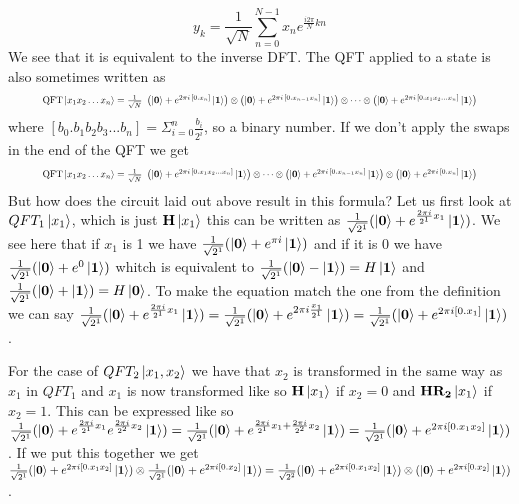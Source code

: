 $$y_{k}={\frac {1}{\sqrt {N}}}\sum _{n=0}^{N-1}x_{n}e^{{\frac {i2\pi }{N}}kn}$$
We see that it is equivalent to the inverse DFT.
The QFT applied to a state is also sometimes written as 
\begin{equation*}
\resizebox{.9\hsize}{!}{${\text{QFT}}\ket{x_{1}x_{2}\ldots x_{n}} ={\frac {1}{\sqrt {N}}}\ \left(\ket{\qtz} +e^{2\pi i\,[0.x_{n}]}\ket{\qto} \right)\otimes \left(\ket{\qtz} +e^{2\pi i\,[0.x_{n-1}x_{n}]}\ket{\qto} \right)\otimes \cdots \otimes \left(\ket{\qtz} +e^{2\pi i\,[0.x_{1}x_{2}\ldots x_{n}]}\ket{\qto} \right)$}
\end{equation*}
where $[b_0.b_1b_2b_3...b_n]=\Sigma^{n}_{i=0}\frac{b_i}{2^i}$, so a binary number\cite{osd}. If we don't apply the swaps in the end of the QFT we get 
\begin{equation*}
    \resizebox{.9\hsize}{!}{${\text{QFT}}\ket{x_{1}x_{2}\ldots x_{n}}={\frac {1}{\sqrt {N}}}\ \left(\ket{\qtz} +e^{2\pi i\,[0.x_{1}x_{2}\ldots x_{n}]}\ket{\qto} \right)\otimes \cdots \otimes \left(\ket{\qtz} +e^{2\pi i\,[0.x_{n-1}x_{n}]}\ket{\qto} \right)\otimes \left(\ket{\qtz} +e^{2\pi i\,[0.x_{n}]}\ket{\qto} \right)$}
\end{equation*}
But how does the circuit laid out above result in this formula?
Let us first look at $QFT_1\ket{x_1}$, which is just $\mathbf{H}\ket{x_1}$ this can be written as $\frac{1}{\sqrt{2^1}}(\ket{\mathbf{0}}+e^{\frac{2\pi i}{2^1}x_1}\ket{\mathbf{1}})$.
We see here that if $x_1$ is 1 we have $\frac{1}{\sqrt{2^1}}(\ket{\mathbf{0}}+e^{\pi i}\ket{\mathbf{1}})$ and if it is 0 we have $\frac{1}{\sqrt{2^1}}(\ket{\mathbf{0}}+e^{0}\ket{\mathbf{1}})$ whitch is equivalent to $\frac{1}{\sqrt{2^1}}(\ket{\mathbf{0}}-\ket{\mathbf{1}})=H\ket{\mathbf{1}}$ and $\frac{1}{\sqrt{2^1}}(\ket{\mathbf{0}}+\ket{\mathbf{1}})=H\ket{\mathbf{0}}$. 
To make the equation match the one from the definition we can say $\frac{1}{\sqrt{2^1}}(\ket{\mathbf{0}}+e^{\frac{2\pi i}{2^1}x_1}\ket{\mathbf{1}})=\frac{1}{\sqrt{2^1}}(\ket{\mathbf{0}}+e^{2\pi i\frac{x_1}{2^1}}\ket{\mathbf{1}})=\frac{1}{\sqrt{2^1}}(\ket{\mathbf{0}}+e^{2\pi i[0.x_1]}\ket{\mathbf{1}})$. 




\vspace{\baselineskip}
\noindent
For the case of $QFT_2\ket{x_1,x_2}$ we have that $x_2$ is transformed in the same way as $x_1$ in $QFT_1$ and $x_1$ is now transformed like so $\mathbf{H}\ket{x_1}$ if $x_2=0$ and $\mathbf{H}\mathbf{R_{2}}\ket{x_1}$ if $x_2=1$. 
This can be expressed like so 
$\frac{1}{\sqrt{2^1}}(\ket{\mathbf{0}}+e^{\frac{2\pi i}{2^1}x_1}e^{\frac{2\pi i}{2^2}x_2}\ket{\mathbf{1}})= \frac{1}{\sqrt{2^1}}(\ket{\mathbf{0}}+e^{\frac{2\pi i}{2^1}x_1+\frac{2\pi i}{2^2}x_2}\ket{\mathbf{1}})=\frac{1}{\sqrt{2^1}}(\ket{\mathbf{0}}+e^{2\pi i[0.x_1x_2]}\ket{\mathbf{1}})$. 
If we put this together we get $\frac{1}{\sqrt{2^1}}(\ket{\mathbf{0}}+e^{2\pi i[0.x_1x_2]}\ket{\mathbf{1}})\otimes \frac{1}{\sqrt{2^1}}(\ket{\mathbf{0}}+e^{2\pi i[0.x_2]}\ket{\mathbf{1}})=\frac{1}{\sqrt{2^2}}(\ket{\mathbf{0}}+e^{2\pi i[0.x_1x_2]}\ket{\mathbf{1}})\otimes(\ket{\mathbf{0}}+e^{2\pi i[0.x_2]}\ket{\mathbf{1}})$. 



